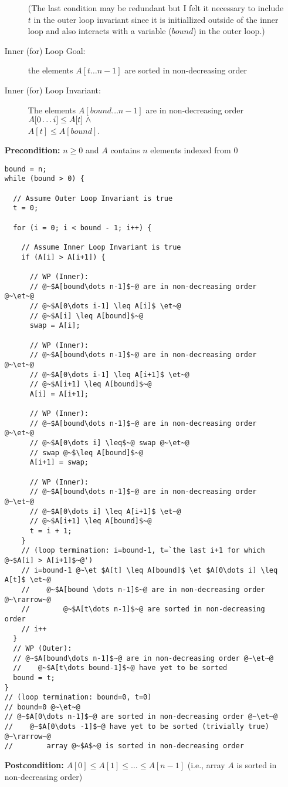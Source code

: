 \documentclass{article}
\begin{document}
\begin{enumerate}
\begin{description}
                                          (The last condition may be redundant but I felt it necessary to include $t$ in the outer loop invariant since it
                                           is initiallized outside of the inner loop and also interacts with a variable ($bound$) in the outer loop.)
    \item [Inner (for) Loop Goal:] the elements $A[t\dots n-1]$ are sorted in non-decreasing order
    \item [Inner (for) Loop Invariant:] The elements $A[bound \dots n-1]$ are in non-decreasing order \et\\ 
                                        $A[0\dots i] \leq A[t] \ \wedge\ \ $ \\
                                        $A[t] \leq A[bound]$.
    \end{description}
{\bf Precondition:} $n \ge 0$ and $A$ contains $n$ elements indexed from 0
\begin{lstlisting}
bound = n; 
while (bound > 0) { 
  
  // Assume Outer Loop Invariant is true
  t = 0;
  
  for (i = 0; i < bound - 1; i++) { 
    
    // Assume Inner Loop Invariant is true
    if (A[i] > A[i+1]) {
      
      // WP (Inner):
      // @~$A[bound\dots n-1]$~@ are in non-decreasing order @~\et~@
      // @~$A[0\dots i-1] \leq A[i]$ \et~@
      // @~$A[i] \leq A[bound]$~@  
      swap = A[i]; 

      // WP (Inner):
      // @~$A[bound\dots n-1]$~@ are in non-decreasing order @~\et~@
      // @~$A[0\dots i-1] \leq A[i+1]$ \et~@
      // @~$A[i+1] \leq A[bound]$~@  
      A[i] = A[i+1];

      // WP (Inner):
      // @~$A[bound\dots n-1]$~@ are in non-decreasing order @~\et~@
      // @~$A[0\dots i] \leq$~@ swap @~\et~@
      // swap @~$\leq A[bound]$~@
      A[i+1] = swap;

      // WP (Inner):
      // @~$A[bound\dots n-1]$~@ are in non-decreasing order @~\et~@
      // @~$A[0\dots i] \leq A[i+1]$ \et~@
      // @~$A[i+1] \leq A[bound]$~@
      t = i + 1; 
    }
    // (loop termination: i=bound-1, t=`the last i+1 for which @~$A[i] > A[i+1]$~@')
    // i=bound-1 @~\et $A[t] \leq A[bound]$ \et $A[0\dots i] \leq A[t]$ \et~@
    //    @~$A[bound \dots n-1]$~@ are in non-decreasing order @~\rarrow~@
    //        @~$A[t\dots n-1]$~@ are sorted in non-decreasing order
    // i++
  }
  // WP (Outer): 
  // @~$A[bound\dots n-1]$~@ are in non-decreasing order @~\et~@
  //    @~$A[t\dots bound-1]$~@ have yet to be sorted
  bound = t;  
} 
// (loop termination: bound=0, t=0)
// bound=0 @~\et~@
// @~$A[0\dots n-1]$~@ are sorted in non-decreasing order @~\et~@
//    @~$A[0\dots -1]$~@ have yet to be sorted (trivially true) @~\rarrow~@ 
//        array @~$A$~@ is sorted in non-decreasing order
\end{lstlisting}
{\bf Postcondition:} $A[0] \le A[1] \le \dots \le A[n-1]$ (i.e., array $A$ is sorted in non-decreasing order)


\end{enumerate}
\end{document}
